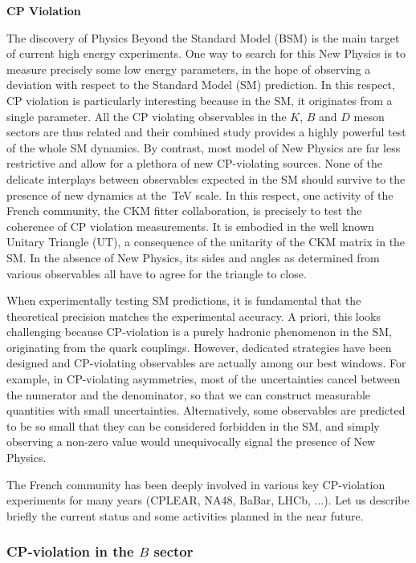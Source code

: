\documentclass[a4paper,12pt]{article}%
\begin{document}
{\large \textbf{CP Violation}}

\vspace{0.5cm}

The discovery of Physics Beyond the Standard Model (BSM) is the main target of
current high energy experiments. One way to search for this New Physics is to
measure precisely some low energy parameters, in the hope of observing a
deviation with respect to the Standard Model (SM) prediction. In this respect,
CP violation is particularly interesting because in the SM, it originates from
a single parameter. All the CP violating observables in the $K$, $B$ and $D$
meson sectors are thus related and their combined study provides a highly
powerful test of the whole SM dynamics. By contrast, most model of New Physics
are far less restrictive and allow for a plethora of new CP-violating sources.
None of the delicate interplays between observables expected in the SM should
survive to the presence of new dynamics at the~TeV scale. In this respect, one
activity of the French community, the CKM fitter collaboration, is precisely
to test the coherence of CP violation measurements. It is embodied in the well
known Unitary Triangle (UT), a consequence of the unitarity of the CKM matrix
in the SM. In the absence of New Physics, its sides and angles as determined
from various observables all have to agree for the triangle to close.

When experimentally testing SM predictions, it is fundamental that the
theoretical precision matches the experimental accuracy. A priori, this looks
challenging because CP-violation is a purely hadronic phenomenon in the SM,
originating from the quark couplings. However, dedicated strategies have been
designed and CP-violating observables are actually among our best windows. For
example, in CP-violating asymmetries, most of the uncertainties cancel between
the numerator and the denominator, so that we can construct measurable
quantities with small uncertainties. Alternatively, some observables are
predicted to be so small that they can be considered forbidden in the SM, and
simply observing a non-zero value would unequivocally signal the presence of
New Physics.

The French community has been deeply involved in various key CP-violation
experiments for many years (CPLEAR, NA48, BaBar, LHCb, ...). Let us describe
briefly the current status and some activities planned in the near future.

\subsubsection*{CP-violation in the $B$ sector}
\end{document}
